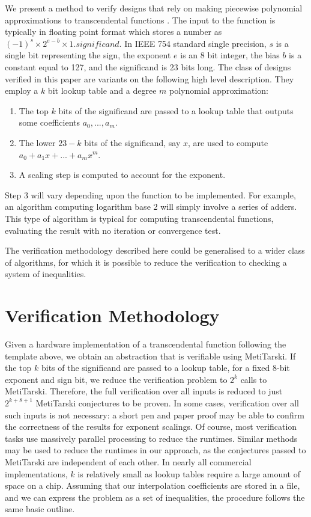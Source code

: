 \documentclass[a4paper]{article}
\begin{document}
We present a method to verify designs that rely on making piecewise polynomial approximations to transcendental functions \cite{tang1991table,strollo2011elementary,pineiro2005high}. The input to the function is typically in floating point format \cite{goldberg1991every} which stores a number as $(-1)^{s} \times 2^{e-b} \times 1.\textit{significand}$. In IEEE 754 standard single precision, $s$ is a single bit representing the sign, the exponent $e$ is an 8 bit integer, the bias $b$ is a constant equal to 127, and the significand is 23 bits long. The class of designs verified in this paper are variants on the following high level description. They employ a $k$ bit lookup table and a degree $m$ polynomial approximation:
\begin{enumerate}
\item The top $k$ bits of the significand are passed to a lookup table that outputs some coefficients $a_0,...,a_m$.
\item The lower $23-k$ bits of the significand, say $x$, are used to compute\newline $a_0+a_1x+...+a_mx^m$.
\item A scaling step is computed to account for the exponent.
\end{enumerate} 
Step 3 will vary depending upon the function to be implemented. For example, an algorithm computing logarithm base 2 will simply involve a series of adders. This type of algorithm is typical for computing transcendental functions, evaluating the result with no iteration or convergence test.

The verification methodology described here could be generalised to a wider class of algorithms, for which it is possible to reduce the verification to checking a system of inequalities. 


\section{Verification Methodology}
Given a hardware implementation of a transcendental function following the template above, we obtain an abstraction that is verifiable using MetiTarski. If the top $k$ bits of the significand are passed to a lookup table, for a fixed 8-bit exponent and sign bit, we reduce the verification problem to $2^k$ calls to MetiTarski. Therefore, the  full verification over all inputs is reduced to 
just $2^{k+8+1}$ MetiTarski conjectures to be proven. In some cases, verification over all such inputs is not necessary: a short pen and paper proof may be able to confirm the correctness of the results for exponent scalings. Of course, most verification tasks use massively parallel processing to reduce the runtimes. Similar methods may be used to reduce the runtimes in our approach, as the conjectures passed to MetiTarski are independent of each other. In nearly all commercial implementations, $k$ is relatively small as lookup tables require a large amount of space on a chip. Assuming that our interpolation coefficients are stored in a file, and we can express the problem as a set of inequalities, the procedure follows the same basic outline.
\end{document}
